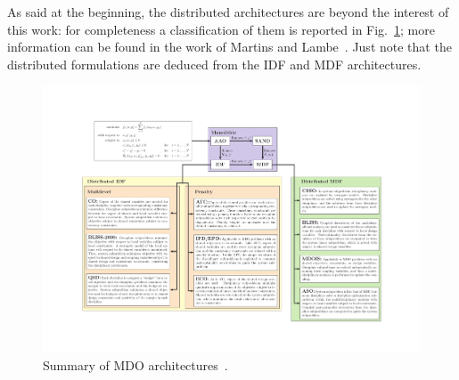As said at the beginning, the distributed architectures are beyond the interest of this work: for completeness a classification of them is reported in Fig.~\ref{fig:mdo_arch_summary}; more information can be found in the work of Martins and Lambe~\cite{bib:martins_mdo}. Just note that the distributed formulations are deduced from the IDF and MDF architectures. 
\begin{figure}[!h]
	\centering
	\includegraphics[keepaspectratio, width=1.3\linewidth, angle=90]{images/app_mdo/mdo_arch_summary}
	\caption{Summary of MDO architectures~\cite{bib:martins_mdo}.}
	\label{fig:mdo_arch_summary}
\end{figure}